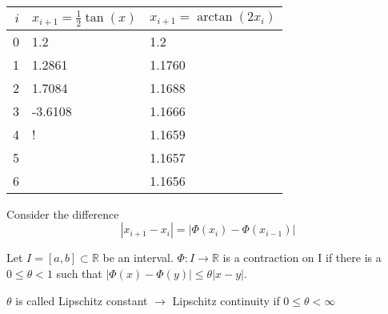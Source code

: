 \begin{center}
    \begin{tabular}{r l l }
        \toprule
        $i$ & $x_{i+1}=\frac{1}{2}\tan(x)$ & $x_{i+1}=\arctan(2x_i)$ \\
        \midrule
        0   & 1.2                          & 1.2                     \\
        1   & 1.2861                       & 1.1760                  \\
        2   & 1.7084                       & 1.1688                  \\
        3   & -3.6108                      & 1.1666                  \\
        4   & {}!                          & 1.1659                  \\
        5   &                              & 1.1657                  \\
        6   &                              & 1.1656                  \\
        \bottomrule
    \end{tabular}
\end{center}
Consider the difference
\begin{equation*}
    |x_{i+1}-x_i| = |\Phi(x_i)-\Phi(x_{i-1})|
\end{equation*}

\begin{definition}
    Let $I=[a,b] \subset \mathbb{R}$ be an interval.
    $\Phi: I \to \mathbb{R}$ is a contraction on I if there is a $0 \leq \theta < 1$
    such that $|\Phi(x)-\Phi(y)| \leq \theta |x-y|$.
\end{definition}

\begin{remark}
    $\theta$ is called Lipschitz constant $\to$ Lipschitz continuity if $0 \leq \theta < \infty$
\end{remark}

